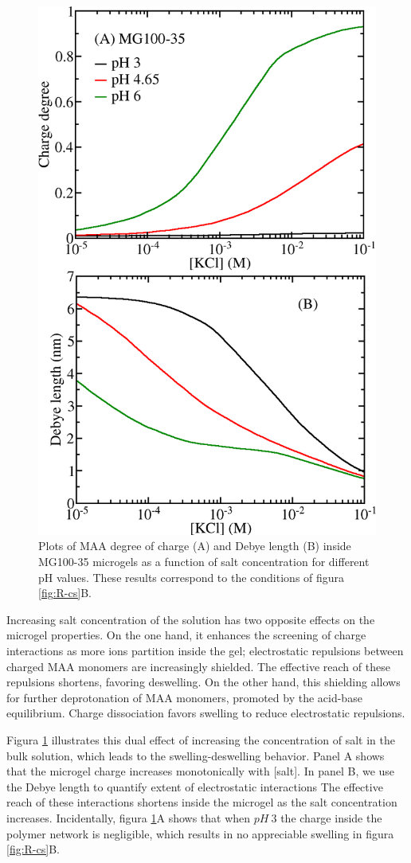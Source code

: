 \begin{figure}[!tb]
	\centering
	\includegraphics[width=0.5\linewidth]{Figures/graph-gel/f-cs.png}
	\caption{Plots of MAA degree of charge (A) and Debye length (B) inside MG100-35 microgels as a function of salt concentration for different pH values.
		These results correspond to the conditions of figura \ref{fig:R-cs}B.}
	\label{fig:f-cs}
\end{figure}




Increasing salt concentration of the solution has two opposite effects on the microgel properties.
On the one hand, it enhances the screening of charge interactions as more ions partition inside the gel; electrostatic repulsions between charged MAA monomers are increasingly shielded.
The effective reach of these repulsions shortens, favoring deswelling.
On the other hand, this shielding allows for further deprotonation of MAA monomers, promoted by the acid-base equilibrium.
Charge dissociation favors swelling to reduce electrostatic repulsions.


Figura \ref{fig:f-cs} illustrates this dual effect of increasing the concentration of salt in the bulk solution, which leads to the swelling-deswelling behavior.
Panel A shows that the microgel charge increases monotonically with [salt].
In panel B, we use the Debye length to quantify extent of electrostatic interactions %
The effective reach of these interactions shortens inside the microgel as the salt concentration increases.
Incidentally, figura \ref{fig:f-cs}A shows that when $pH~3$ the charge inside the polymer network is negligible, which results in no appreciable swelling in figura \ref{fig:R-cs}B.



